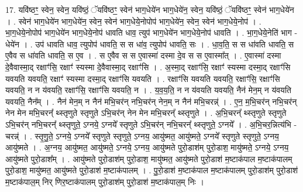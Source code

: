 \documentclass[17pt]{extarticle}
\begin{document}
17. यवि॑ष्ठꣳ॒॒ स्वेन॒ स्वेन॒ यवि॑ष्ठं॒ ॅयवि॑ष्ठꣳ॒॒ स्वेन॑ भाग॒धेये॑न भाग॒धेये॑न॒ स्वेन॒ यवि॑ष्ठं॒ ॅयवि॑ष्ठꣳ॒॒ स्वेन॑ भाग॒धेये॑न । . स्वेन॑ भाग॒धेये॑न भाग॒धेये॑न॒ स्वेन॒ स्वेन॑ भाग॒धेये॒नोपोप॑ भाग॒धेये॑न॒ स्वेन॒ स्वेन॑ भाग॒धेये॒नोप॑ । . भा॒ग॒धेये॒नोपोप॑ भाग॒धेये॑न भाग॒धेये॒नोप॑ धावति धाव॒ त्युप॑ भाग॒धेये॑न भाग॒धेये॒नोप॑ धावति । . भा॒ग॒धेये॒नेति॑ भाग - धेये॑न । . उप॑ धावति धाव॒ त्युपोप॑ धावति॒ स स धा॑व॒ त्युपोप॑ धावति॒ सः । . धा॒व॒ति॒ स स धा॑वति धावति॒ स ए॒वैव स धा॑वति धावति॒ स ए॒व । . स ए॒वैव स स ए॒वास्मा॑ दस्मा दे॒व स स ए॒वास्मा᳚त् । . ए॒वास्मा॑ दस्मा दे॒वैवास्मा॒द् रक्षाꣳ॑सि॒ रक्षाꣳ॑ स्यस्मा दे॒वैवास्मा॒द् रक्षाꣳ॑सि । . अ॒स्मा॒द् रक्षाꣳ॑सि॒ रक्षाꣳ॑ स्यस्मा दस्मा॒द् रक्षाꣳ॑सि यवयति यवयति॒ रक्षाꣳ॑ स्यस्मा दस्मा॒द् रक्षाꣳ॑सि यवयति । . रक्षाꣳ॑सि यवयति यवयति॒ रक्षाꣳ॑सि॒ रक्षाꣳ॑सि यवयति॒ न न य॑वयति॒ रक्षाꣳ॑सि॒ रक्षाꣳ॑सि यवयति॒ न । . य॒व॒य॒ति॒ न न य॑वयति यवयति॒ नैन॑ मेन॒म् न य॑वयति यवयति॒ नैन᳚म् । . नैन॑ मेन॒म् न नैन॑ मभि॒चर॑न् नभि॒चर॑न् नेन॒म् न नैन॑ मभि॒चरन्न्॑ । . ए॒न॒ म॒भि॒चर॑न् नभि॒चर॑न् नेन मेन मभि॒चरन्᳚ थ्स्तृणुते स्तृणुते ऽभि॒चर॑न् नेन मेन मभि॒चरन्᳚ थ्स्तृणुते । . अ॒भि॒चरन्᳚ थ्स्तृणुते स्तृणुते ऽभि॒चर॑न् नभि॒चरन्᳚ थ्स्तृणुते॒ ऽग्नये॒ ऽग्नये᳚ स्तृणुते ऽभि॒चर॑न् नभि॒चरन्᳚ थ्स्तृणुते॒ ऽग्नये᳚ । . अ॒भि॒चर॒न्नित्य॑भि - चरन्न्॑ । . स्तृ॒णु॒ते॒ ऽग्नये॒ ऽग्नये᳚ स्तृणुते स्तृणुते॒ ऽग्नय॒ आयु॑ष्मत॒ आयु॑ष्मते॒ ऽग्नये᳚ स्तृणुते स्तृणुते॒ ऽग्नय॒ आयु॑ष्मते । . अ॒ग्नय॒ आयु॑ष्मत॒ आयु॑ष्मते॒ ऽग्नये॒ ऽग्नय॒ आयु॑ष्मते पुरो॒डाश॑म् पुरो॒डाश॒ मायु॑ष्मते॒ ऽग्नये॒ ऽग्नय॒ आयु॑ष्मते पुरो॒डाश᳚म् । . आयु॑ष्मते पुरो॒डाश॑म् पुरो॒डाश॒ मायु॑ष्मत॒ आयु॑ष्मते पुरो॒डाश॑ म॒ष्टाक॑पाल म॒ष्टाक॑पालम् पुरो॒डाश॒ मायु॑ष्मत॒ आयु॑ष्मते पुरो॒डाश॑ म॒ष्टाक॑पालम् । . पु॒रो॒डाश॑ म॒ष्टाक॑पाल म॒ष्टाक॑पालम् पुरो॒डाश॑म् पुरो॒डाश॑ म॒ष्टाक॑पाल॒म् निर् णिर॒ष्टाक॑पालम् पुरो॒डाश॑म् पुरो॒डाश॑ म॒ष्टाक॑पाल॒म् निः । \newline
\end{document}

